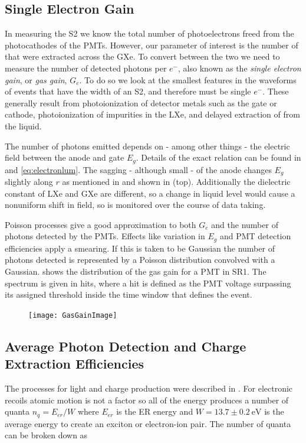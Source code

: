 \subsection{Single Electron Gain}
\label{subsec:calibrations_single_electron_gain}
In measuring the S2 we know the total number of photoelectrons freed from the photocathodes of the PMTs.  However, our parameter of
interest is the number of \electron that were extracted across the GXe.  To convert between the two we need to measure the number of
detected photons per $e^-$, also known as the \textit{single electron gain}, or \textit{gas gain}, $G_e$.  To do so we look at the
smallest features in the waveforms of events that have the width of an S2, and therefore must be single $e^-$.  These generally result
from photoionization of detector metals such as the gate or cathode, photoionization of impurities in the LXe, and delayed extraction
of \electron from the liquid.

The number of photons emitted depends on - among other things - the electric field between the anode and gate $E_g$.  Details of the
exact relation can be found in  and \eqref{eq:electronlum}.  The sagging - although small - of the
anode changes $E_g$ slightly along $r$ as mentioned in  and shown in
 (top).  Additionally the dielectric constant of LXe and GXe are different, so a change in liquid level
would cause a nonuniform shift in field, so is monitored over the course of data taking.

Poisson processes give a good approximation to both $G_e$ and the number of photons detected by the PMTs.  Effects like variation in $E_g$
and PMT detection efficiencies apply a smearing.  If this is taken to be Gaussian the number of photons detected is represented by a
Poisson distribution convolved with a Gaussian.   shows the distribution of
the gas gain for a PMT in SR1.  The spectrum is given in hits, where a hit is defined as the PMT voltage surpassing its assigned threshold
inside the time window that defines the event.

\begin{figure}
\centering
\texttt{[image: GasGainImage]}
\label{fig:calibrations_single_electron_gain_num_photons}
\end{figure}



\subsection{Average Photon Detection and Charge Extraction Efficiencies}
\label{subsec:photon_charge_efficiencies}
The processes for light and charge production were described in .  For electronic recoils atomic motion is
not a factor so all of the energy produces a number of quanta $n_q = E_{er} / W$ where $E_{er}$ is the ER energy and
$W = 13.7 \pm 0.2\ \mathrm{eV}$ is the average energy to create an exciton or electron-ion pair.  The number of quanta can be broken
down as

